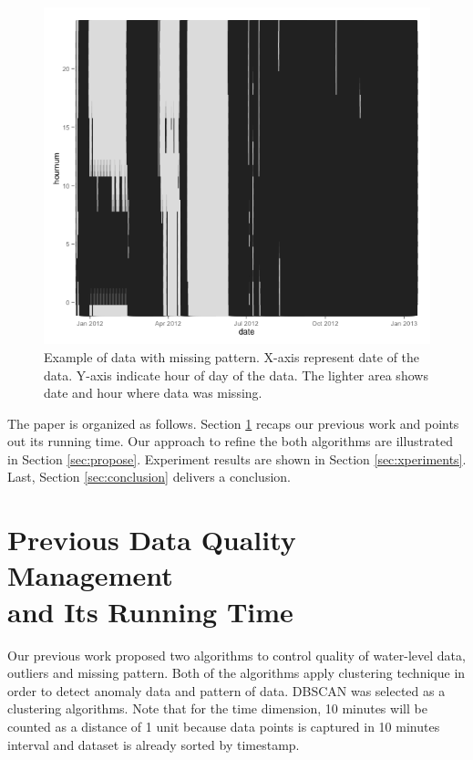 \documentclass[conference]{IEEEtran}
\begin{document}
\begin{figure}
	\includegraphics[width=\linewidth]{figure3.png}
	\caption{Example of data with missing pattern. X-axis represent date of the data. Y-axis indicate hour of day of the data. The lighter area shows date and hour where data was missing.}
	\label{fig:example_missingpattern}
\end{figure}

The paper is organized as follows. Section \ref{sec:previous} recaps our previous work and points out its running time. Our approach to refine the both algorithms are illustrated in Section \ref{sec:propose}. Experiment results are shown in Section \ref{sec:xperiments}. Last, Section \ref{sec:conclusion} delivers a conclusion.

\section{Previous Data Quality Management\\and Its Running Time} \label{sec:previous}

Our previous work proposed two algorithms to control quality of water-level data, outliers and missing pattern. Both of the algorithms apply clustering technique in order to detect anomaly data and pattern of data. DBSCAN was selected as a clustering algorithms. Note that for the time dimension, 10 minutes will be counted as a distance of 1 unit because data points is captured in 10 minutes interval and dataset is already sorted by timestamp.
\end{document}
